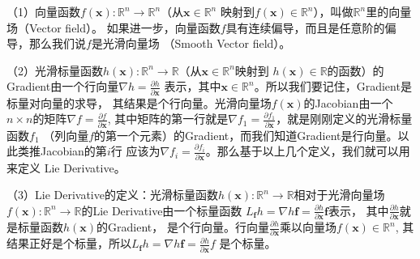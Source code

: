 \documentclass{article}
\begin{document}
（1）向量函数$f(\textbf{x}):\mathbb{R}^n\rightarrow\mathbb{R}^n$（从$\textbf{x}\in\mathbb{R}^n$
映射到$f(\textbf{x})\in\mathbb{R}^n$），叫做$\mathbb{R}^n$里的向量场（Vector field）。
如果进一步，向量函数$f$具有连续偏导，而且是任意阶的偏导，那么我们说$f$是光滑向量场
（Smooth Vector field）。\par

（2）光滑标量函数$h(\textbf{x}):\mathbb{R}^n\rightarrow\mathbb{R}$（从$\textbf{x}\in\mathbb{R}^n$映射到
$h(\textbf{x})\in\mathbb{R}$的函数）的Gradient由一个行向量$\nabla{h}=\frac{\partial{h}}{\partial{\textbf{x}}}$
表示，其中$\textbf{x}\in\mathbb{R}^n$。所以我们要记住，Gradient是标量对向量的求导，
其结果是个行向量。光滑向量场$f(\textbf{x})$的Jacobian由一个$n\times{n}$的矩阵$\nabla{f}=\frac{\partial{f}}{\partial{\textbf{x}}}$,
其中矩阵的第一行就是$\nabla{f_1}=\frac{\partial{f_1}}{\partial{\textbf{x}}}$，就是刚刚定义的光滑标量函数$f_1$
（列向量$f$的第一个元素）的Gradient，而我们知道Gradient是行向量。以此类推Jacobian的第$i$行
应该为$\nabla{f_i}=\frac{\partial{f_i}}{\partial{\textbf{x}}}$。那么基于以上几个定义，我们就可以用来定义
Lie Derivative。\par

（3）Lie Derivative的定义：光滑标量函数$h(\textbf{x}):\mathbb{R}^n\rightarrow\mathbb{R}$相对于光滑向量场
$f(\textbf{x}):\mathbb{R}^n\rightarrow\mathbb{R}$的Lie Derivative由一个标量函数
$L_\textbf{f}h=\nabla{h}\textbf{f}=\frac{\partial{h}}{\partial{\textbf{x}}}\textbf{f}$表示，
其中$\frac{\partial{h}}{\partial{\textbf{x}}}$就是标量函数$h(\textbf{x})$的Gradient，
是个行向量。行向量$\frac{\partial{h}}{\partial{\textbf{x}}}$乘以向量场$f(\textbf{x})\in\mathbb{R}^n$,
其结果正好是个标量，所以$L_\textbf{f}h=\nabla{h}\textbf{f}=\frac{\partial{h}}{\partial{\textbf{x}}}f$
是个标量。\par
\end{document}
